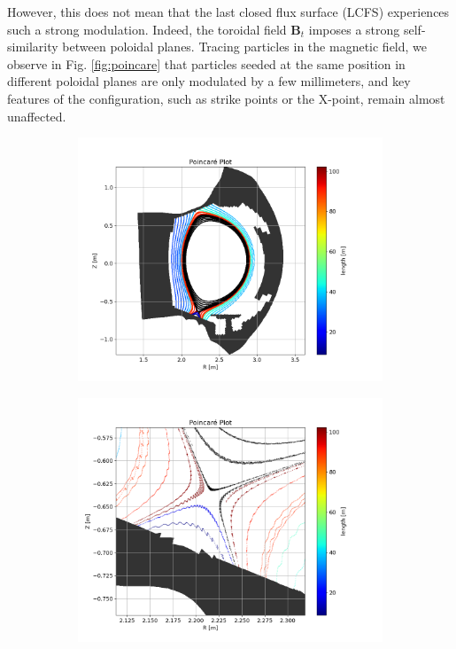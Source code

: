 However, this does not mean that the last closed flux surface (LCFS) experiences such a strong modulation. Indeed, the toroidal field $\textbf{B}_t$ imposes a strong self-similarity between poloidal planes. Tracing particles in the magnetic field, we observe in Fig. \ref{fig:poincare} that particles seeded at the same position in different poloidal planes are only modulated by a few millimeters, and key features of the configuration, such as strike points or the X-point, remain almost unaffected. \newline

\begin{figure}[H]\centering
	\begin{subfigure}[t]{0.49\textwidth}
		\centering
		\includegraphics[width=1\textwidth]{schemes/WESTpoincareFull.png}
		\label{fig:poincareFull}
	\end{subfigure}
	\begin{subfigure}[t]{0.49\textwidth}
		\centering
		\includegraphics[width=1\textwidth]{schemes/WESTpoincareXpt.png}

\end{subfigure}
\end{figure}
